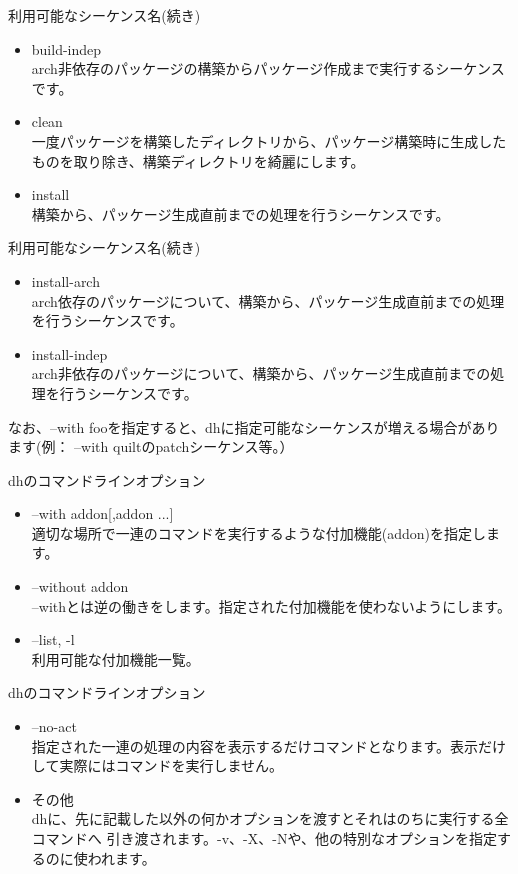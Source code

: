 \begin{frame}{利用可能なシーケンス名(続き)}
\small
\begin{itemize}
\item build-indep \\
arch非依存のパッケージの構築からパッケージ作成まで実行するシーケンスです。
\item clean\\
一度パッケージを構築したディレクトリから、パッケージ構築時に生成したものを取り除き、構築ディレクトリを綺麗にします。
\item install \\
構築から、パッケージ生成直前までの処理を行うシーケンスです。
\end{itemize}
\end{frame}
\begin{frame}{利用可能なシーケンス名(続き)}
\small
\begin{itemize}
\item install-arch \\
arch依存のパッケージについて、構築から、パッケージ生成直前までの処理を行うシーケンスです。
\item install-indep \\
arch非依存のパッケージについて、構築から、パッケージ生成直前までの処理を行うシーケンスです。
\end{itemize}
なお、--with fooを指定すると、dhに指定可能なシーケンスが増える場合があります(例： --with quiltのpatchシーケンス等。）
\end{frame}
\begin{frame}{dhのコマンドラインオプション}
\begin{itemize}
\item --with addon[,addon ...] \\
適切な場所で一連のコマンドを実行するような付加機能(addon)を指定します。
\item --without addon\\
--withとは逆の働きをします。指定された付加機能を使わないようにします。
\item --list, -l \\
利用可能な付加機能一覧。
\end{itemize}
\end{frame}
\begin{frame}{dhのコマンドラインオプション}
\begin{itemize}
\item --no-act \\
指定された一連の処理の内容を表示するだけコマンドとなります。表示だけして実際にはコマンドを実行しません。
\item その他 \\
dhに、先に記載した以外の何かオプションを渡すとそれはのちに実行する全コマンドへ
引き渡されます。-v、-X、-Nや、他の特別なオプションを指定するのに使われます。
\end{itemize}
\end{frame}

